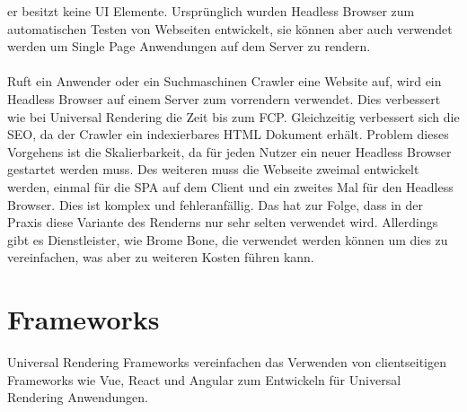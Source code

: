 \documentclass[runningheads]{llncs}
\begin{document}
er besitzt keine UI Elemente. 
Ursprünglich wurden Headless Browser zum automatischen Testen von Webseiten entwickelt, 
sie können aber auch verwendet werden um Single Page Anwendungen auf dem Server zu rendern. 
\\
\\
Ruft ein Anwender oder ein Suchmaschinen Crawler eine Website auf, 
wird ein Headless Browser auf einem Server zum vorrendern verwendet. 
Dies verbessert wie bei Universal Rendering die Zeit bis zum FCP. Gleichzeitig verbessert sich die SEO, da der Crawler ein indexierbares HTML Dokument erhält. 
Problem dieses Vorgehens ist die Skalierbarkeit, 
da für jeden Nutzer ein neuer Headless Browser gestartet werden muss. 
Des weiteren muss die Webseite zweimal entwickelt werden, 
einmal für die SPA auf dem Client und ein zweites Mal für den Headless Browser. 
Dies ist komplex und fehleranfällig. Das hat zur Folge, 
dass in der Praxis diese Variante des Renderns nur sehr selten verwendet wird. 
Allerdings gibt es Dienstleister, wie Brome Bone, 
die verwendet werden können um dies zu vereinfachen, 
was aber zu weiteren Kosten führen kann.

\newpage

\section{Frameworks}
\label{sec:Evaluation}
Universal Rendering Frameworks vereinfachen das Verwenden von clientseitigen Frameworks wie Vue, 
React und Angular zum Entwickeln für Universal Rendering Anwendungen. 
\end{document}
